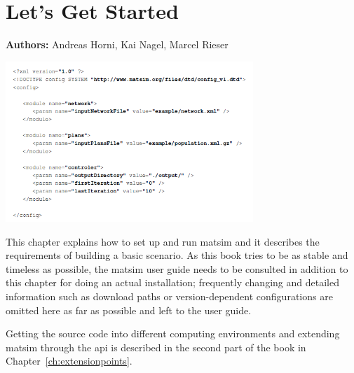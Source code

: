 \chapter{Let's Get Started}
\label{ch:lgstarted}
\hfill \textbf{Authors:} Andreas Horni, Kai Nagel, Marcel Rieser

\begin{center} \includegraphics[width=0.7\textwidth, angle=0]{using/figures/config.png} \end{center}

This chapter explains how to set up and run \gls{matsim} and it describes the requirements of building a basic \gls{scenario}. As this book tries to be as stable and timeless as possible, the \gls{matsim} user guide \citep[][]{MATSim_Userguide_2015} needs to be consulted in addition to this chapter for doing an actual installation; frequently changing and detailed information such as download paths or version-dependent configurations are omitted here as far as possible and left to the user guide. 

Getting the source code into different computing environments and extending \gls{matsim} through the \gls{api} is described in the second part of the book in Chapter~\ref{ch:extensionpoints}.


